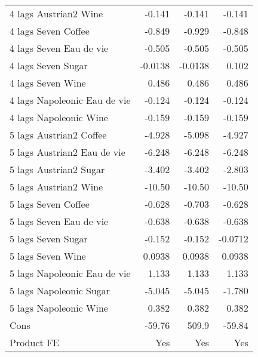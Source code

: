 {\begin{longtable}{l*{3}{D{.}{.}{-1}}}
4 lags Austrian2 Wine&      -0.141         &      -0.141         &      -0.141         \\
4 lags Seven Coffee &      -0.849\sym{***}&      -0.929\sym{***}&      -0.848\sym{***}\\
4 lags Seven Eau de vie&      -0.505\sym{*}  &      -0.505\sym{*}  &      -0.505\sym{*}  \\
4 lags Seven Sugar  &     -0.0138         &     -0.0138         &       0.102         \\
4 lags Seven Wine   &       0.486\sym{***}&       0.486\sym{***}&       0.486\sym{***}\\
4 lags Napoleonic Eau de vie&      -0.124         &      -0.124         &      -0.124         \\
4 lags Napoleonic Wine&      -0.159         &      -0.159         &      -0.159         \\
5 lags Austrian2 Coffee&      -4.928\sym{***}&      -5.098\sym{***}&      -4.927\sym{***}\\
5 lags Austrian2 Eau de vie&      -6.248\sym{***}&      -6.248\sym{***}&      -6.248\sym{***}\\
5 lags Austrian2 Sugar&      -3.402\sym{***}&      -3.402\sym{***}&      -2.803\sym{***}\\
5 lags Austrian2 Wine&      -10.50\sym{***}&      -10.50\sym{***}&      -10.50\sym{***}\\
5 lags Seven Coffee &      -0.628\sym{***}&      -0.703\sym{***}&      -0.628\sym{***}\\
5 lags Seven Eau de vie&      -0.638\sym{**} &      -0.638\sym{**} &      -0.638\sym{**} \\
5 lags Seven Sugar  &      -0.152         &      -0.152         &     -0.0712         \\
5 lags Seven Wine   &      0.0938         &      0.0938         &      0.0938         \\
5 lags Napoleonic Eau de vie&       1.133         &       1.133         &       1.133         \\
5 lags Napoleonic Sugar&      -5.045\sym{***}&      -5.045\sym{***}&      -1.780\sym{**} \\
5 lags Napoleonic Wine&       0.382\sym{*}  &       0.382\sym{*}  &       0.382\sym{*}  \\
Cons                &      -59.76\sym{***}&       509.9         &      -59.84\sym{***}\\
Product FE          &         Yes         &         Yes         &         Yes         \\

\end{longtable}}
